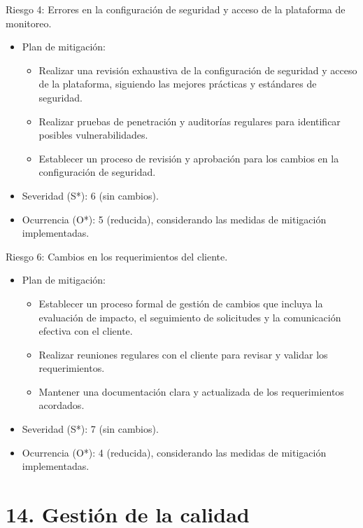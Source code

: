 \documentclass[
11pt, %
]{charter}
\begin{document}
Riesgo 4: Errores en la configuración de seguridad y acceso de la plataforma de monitoreo.
\begin{itemize}
	\item Plan de mitigación: 
        \begin{itemize}
	       \item Realizar una revisión exhaustiva de la configuración de seguridad y acceso de la plataforma, siguiendo las mejores prácticas y estándares de seguridad. 
	       \item Realizar pruebas de penetración y auditorías regulares para identificar posibles vulnerabilidades. 
	       \item Establecer un proceso de revisión y aprobación para los cambios en la configuración de seguridad.
        \end{itemize}
	\item Severidad (S*): 6 (sin cambios).
	\item Ocurrencia (O*): 5 (reducida), considerando las medidas de mitigación implementadas.
\end{itemize}

Riesgo 6: Cambios en los requerimientos del cliente.
\begin{itemize}
	\item Plan de mitigación: 
        \begin{itemize}
	       \item Establecer un proceso formal de gestión de cambios que incluya la evaluación de impacto, el seguimiento de solicitudes y la comunicación efectiva con el cliente. 
	       \item Realizar reuniones regulares con el cliente para revisar y validar los requerimientos. 
	       \item  Mantener una documentación clara y actualizada de los requerimientos acordados.
        \end{itemize}
	\item Severidad (S*): 7 (sin cambios).
	\item Ocurrencia (O*): 4 (reducida), considerando las medidas de mitigación implementadas.
\end{itemize}

\section{14. Gestión de la calidad}
\label{sec:calidad}
\end{document}
